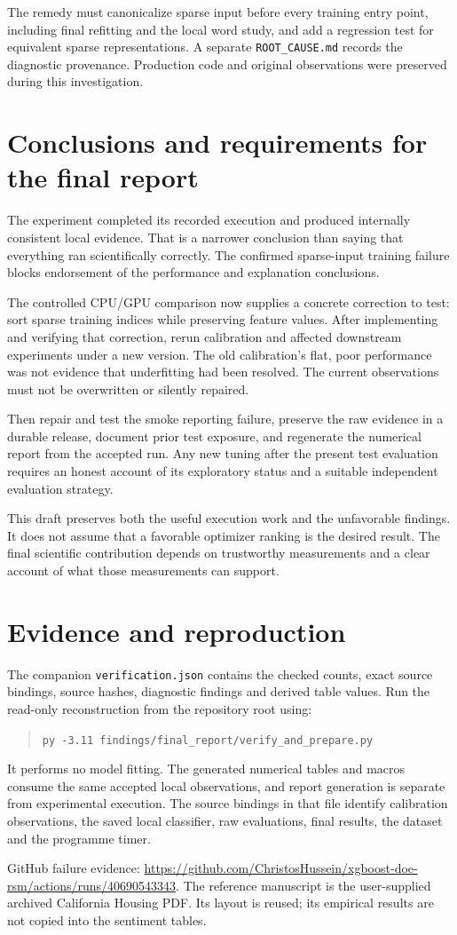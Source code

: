 \documentclass[12pt,a4paper]{article}
\begin{document}
The remedy must canonicalize sparse input before every training entry point, including final refitting and the local word study, and add a regression test for equivalent sparse representations. A separate \texttt{ROOT\_CAUSE.md} records the diagnostic provenance. Production code and original observations were preserved during this investigation.

\section{Conclusions and requirements for the final report}
The experiment completed its recorded execution and produced internally consistent local evidence. That is a narrower conclusion than saying that everything ran scientifically correctly. The confirmed sparse-input training failure blocks endorsement of the performance and explanation conclusions.

The controlled CPU/GPU comparison now supplies a concrete correction to test: sort sparse training indices while preserving feature values. After implementing and verifying that correction, rerun calibration and affected downstream experiments under a new version. The old calibration's flat, poor performance was not evidence that underfitting had been resolved. The current observations must not be overwritten or silently repaired.

Then repair and test the smoke reporting failure, preserve the raw evidence in a durable release, document prior test exposure, and regenerate the numerical report from the accepted run. Any new tuning after the present test evaluation requires an honest account of its exploratory status and a suitable independent evaluation strategy.

This draft preserves both the useful execution work and the unfavorable findings. It does not assume that a favorable optimizer ranking is the desired result. The final scientific contribution depends on trustworthy measurements and a clear account of what those measurements can support.

\appendix
\section{Evidence and reproduction}
The companion \texttt{verification.json} contains the checked counts, exact source bindings, source hashes, diagnostic findings and derived table values. Run the read-only reconstruction from the repository root using:
\begin{quote}\small\texttt{py -3.11 findings/final\_report/verify\_and\_prepare.py}\end{quote}
It performs no model fitting. The generated numerical tables and macros consume the same accepted local observations, and report generation is separate from experimental execution. The source bindings in that file identify calibration observations, the saved local classifier, raw evaluations, final results, the dataset and the programme timer.

GitHub failure evidence: \url{https://github.com/ChristosHussein/xgboost-doe-rsm/actions/runs/40690543343}. The reference manuscript is the user-supplied archived California Housing PDF. Its layout is reused; its empirical results are not copied into the sentiment tables.
\end{document}
